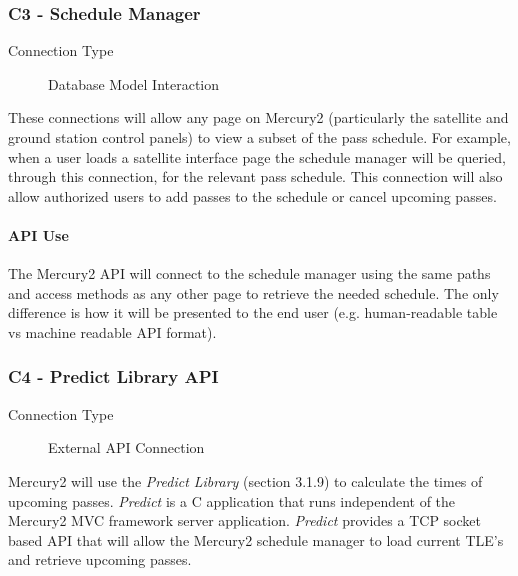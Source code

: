 \documentclass{mxl-note}
\begin{document}
\subsubsection{C3 - Schedule Manager}
\begin{description}
	\item [Connection Type] Database Model Interaction
\end{description}
These connections will allow any page on Mercury2 (particularly the satellite and ground station control panels) to view a subset of the pass schedule. For example, when a user loads a satellite interface page the schedule manager will be queried, through this connection, for the relevant pass schedule. This connection will also allow authorized users to add passes to the schedule or cancel upcoming passes.

\paragraph{API Use}The Mercury2 API will connect to the schedule manager using the same paths and access methods as any other page to retrieve the needed schedule. The only difference is how it will be presented to the end user (e.g. human-readable table vs machine readable API format).

\subsubsection{C4 - Predict Library API}
\begin{description}
	\item [Connection Type] External API Connection
\end{description}
Mercury2 will use the \textit{Predict Library} (section 3.1.9) to calculate the times of upcoming passes. \textit{Predict} is a C application that runs independent of the Mercury2 MVC framework server application. \textit{Predict} provides a TCP socket based API that will allow the Mercury2 schedule manager to load current TLE's and retrieve upcoming passes.
\end{document}
